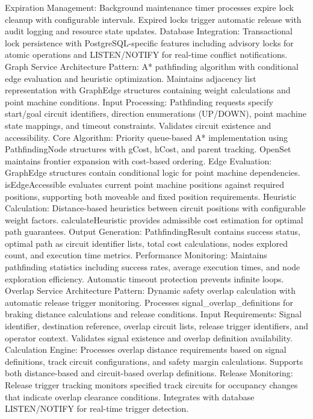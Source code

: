 Expiration Management: Background maintenance timer processes expire lock cleanup with configurable intervals. Expired locks trigger automatic release with audit logging and resource state updates.
Database Integration: Transactional lock persistence with PostgreSQL-specific features including advisory locks for atomic operations and LISTEN/NOTIFY for real-time conflict notifications.
Graph Service
Architecture Pattern: A* pathfinding algorithm with conditional edge evaluation and heuristic optimization. Maintains adjacency list representation with GraphEdge structures containing weight calculations and point machine conditions.
Input Processing: Pathfinding requests specify start/goal circuit identifiers, direction enumerations (UP/DOWN), point machine state mappings, and timeout constraints. Validates circuit existence and accessibility.
Core Algorithm: Priority queue-based A* implementation using PathfindingNode structures with gCost, hCost, and parent tracking. OpenSet maintains frontier expansion with cost-based ordering.
Edge Evaluation: GraphEdge structures contain conditional logic for point machine dependencies. isEdgeAccessible evaluates current point machine positions against required positions, supporting both moveable and fixed position requirements.
Heuristic Calculation: Distance-based heuristics between circuit positions with configurable weight factors. calculateHeuristic provides admissible cost estimation for optimal path guarantees.
Output Generation: PathfindingResult contains success status, optimal path as circuit identifier lists, total cost calculations, nodes explored count, and execution time metrics.
Performance Monitoring: Maintains pathfinding statistics including success rates, average execution times, and node exploration efficiency. Automatic timeout protection prevents infinite loops.
Overlap Service
Architecture Pattern: Dynamic safety overlap calculation with automatic release trigger monitoring. Processes signal_overlap_definitions for braking distance calculations and release conditions.
Input Requirements: Signal identifier, destination reference, overlap circuit lists, release trigger identifiers, and operator context. Validates signal existence and overlap definition availability.
Calculation Engine: Processes overlap distance requirements based on signal definitions, track circuit configurations, and safety margin calculations. Supports both distance-based and circuit-based overlap definitions.
Release Monitoring: Release trigger tracking monitors specified track circuits for occupancy changes that indicate overlap clearance conditions. Integrates with database LISTEN/NOTIFY for real-time trigger detection.
